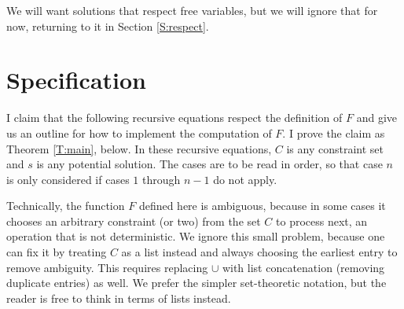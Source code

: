 \documentclass{article}
\begin{document}
We will want solutions that respect free variables, but we will ignore that for now, returning to it in Section \ref{S:respect}.

\section{Specification}\label{S:spec}%

I claim that the following recursive equations respect the definition of $F$ and give us an outline for how to implement the computation of $F$.  I prove the claim as Theorem \ref{T:main}, below.  In these recursive equations, $C$ is any constraint set and $s$ is any potential solution.  The cases are to be read in order, so that case $n$ is only considered if cases $1$ through $n-1$ do not apply.

Technically, the function $F$ defined here is ambiguous, because in some cases it chooses an arbitrary constraint (or two) from the set $C$ to process next, an operation that is not deterministic.  We ignore this small problem, because one can fix it by treating $C$ as a list instead and always choosing the earliest entry to remove ambiguity.  This requires replacing $\cup$ with list concatenation (removing duplicate entries) as well.  We prefer the simpler set-theoretic notation, but the reader is free to think in terms of lists instead.
\end{document}
